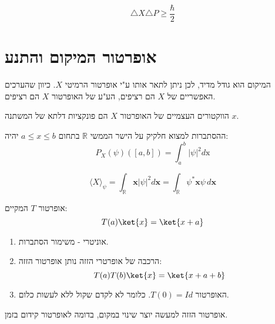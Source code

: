 \documentclass{tstextbook}
\begin{document}
\begin{proposition}
$$\triangle X\triangle P\geq{\frac{\hbar}{2}}$$

\end{proposition}
\section{אופרטור המיקום והתנע}

\begin{definition}
המיקום הוא גודל מדיד, לכן ניתן לתאר אותו ע"י אופרטור הרמיטי \(X\). כיוון שהערכים האפשריים של \(X\) הם רציפים, הע"ע של האופרטור \(X\) הם רציפים.

\end{definition}
\begin{proposition}
הווקטורים העצמיים של האופרטור \(X\) הם פונקציות דלתא של המשתנה \(x\).

\end{proposition}
\begin{proposition}
ההסתברות למצוא חלקיק על הישר הממשי \(\mathbb{R}\) בתחום \(a\leq x \leq b\) יהיה:
$$P_{X}(\psi)([a,b])=\int_{a}^{b}|\psi|^{2}d\!\mathrm{x}$$

\end{proposition}
\begin{proposition}
$$\langle X\rangle_{\psi}=\int_{\mathbb{R}}\mathbf{x}|\psi|^{2}d\mathbf{x}=\int_{\mathbb{R}}{\psi^{*}\mathbf{x}\psi\,d\mathbf{x}}$$

\end{proposition}
\begin{definition}
אופרטור \(T\) המקיים:
$$T(a)\ket{x} = \ket{x+a}$$

\end{definition}
\begin{proposition}
  \begin{enumerate}
    \item אוניטרי - משימור הסתברות.  


    \item הרכבה של אופרטרי הזזה נותן אופרטור הזזה: 
$$T(a)T(b)\ket{x}=\ket{x+a+b}  $$


    \item האופרטור \(T(0)=Id\). כלומר לא לקדם שקול ללא לעשות כלום. 


  \end{enumerate}
\end{proposition}
\begin{remark}
אופרטור הזזה למעשה יוצר שינוי במקום, בדומה לאופרטור קידום בזמן.

\end{remark}
\end{document}
